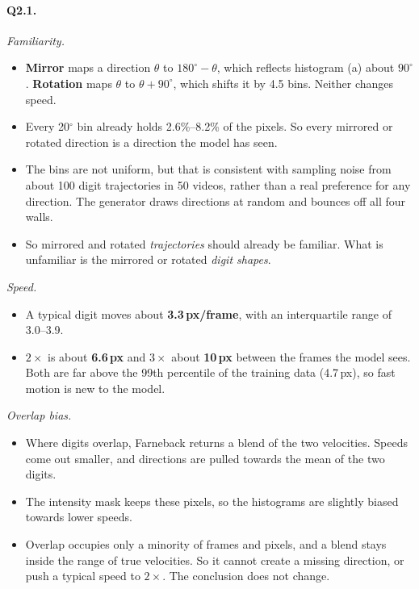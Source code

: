 \documentclass[11pt,a4paper]{article}
\begin{document}
\paragraph{Q2.1.} \emph{Familiarity.}
\begin{itemize}
  \item \textbf{Mirror} maps a direction $\theta$ to $180^\circ-\theta$, which
        reflects histogram (a) about $90^\circ$. \textbf{Rotation} maps $\theta$
        to $\theta+90^\circ$, which shifts it by 4.5 bins. Neither changes
        speed.
  \item Every 20$^\circ$ bin already holds 2.6\%--8.2\% of the pixels. So every
        mirrored or rotated direction is a direction the model has seen.
  \item The bins are not uniform, but that is consistent with sampling noise
        from about 100 digit trajectories in 50 videos, rather than a real
        preference for any direction. The generator draws directions at random
        and bounces off all four walls.
  \item So mirrored and rotated \emph{trajectories} should already be familiar.
        What is unfamiliar is the mirrored or rotated \emph{digit shapes}.
\end{itemize}
\emph{Speed.}
\begin{itemize}
  \item A typical digit moves about \textbf{3.3\,px/frame}, with an
        interquartile range of 3.0--3.9.
  \item $2\times$ is about \textbf{6.6\,px} and $3\times$ about
        \textbf{10\,px} between the frames the model sees. Both are far above
        the 99th percentile of the training data (4.7\,px), so fast motion is
        new to the model.
\end{itemize}
\emph{Overlap bias.}
\begin{itemize}
  \item Where digits overlap, Farneback returns a blend of the two velocities.
        Speeds come out smaller, and directions are pulled towards the mean of
        the two digits.
  \item The intensity mask keeps these pixels, so the histograms are slightly
        biased towards lower speeds.
  \item Overlap occupies only a minority of frames and pixels, and a blend
        stays inside the range of true velocities. So it cannot create a
        missing direction, or push a typical speed to $2\times$. The conclusion
        does not change.
\end{itemize}
\end{document}

